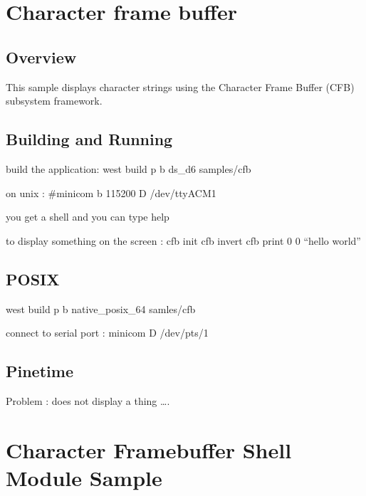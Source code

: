 \documentclass[letterpaper,10pt,english]{sphinxmanual}
\begin{document}
\section{Character frame buffer}
\label{\detokenize{samples/samplescfbREADME:character-frame-buffer}}\label{\detokenize{samples/samplescfbREADME:character-frame-buffer-sample}}\label{\detokenize{samples/samplescfbREADME::doc}}

\subsection{Overview}
\label{\detokenize{samples/samplescfbREADME:overview}}
This sample displays character strings using the Character Frame Buffer
(CFB) subsystem framework.


\subsection{Building and Running}
\label{\detokenize{samples/samplescfbREADME:building-and-running}}
build the application: west build \sphinxhyphen{}p \sphinxhyphen{}b ds\_d6 samples/cfb

on unix : \#minicom \sphinxhyphen{}b 115200 \sphinxhyphen{}D /dev/ttyACM1

you get a shell and you can type help

to display something on the screen :
cfb init
cfb invert
cfb print 0 0 “hello world”


\subsection{POSIX}
\label{\detokenize{samples/samplescfbREADME:posix}}
west build \sphinxhyphen{}p \sphinxhyphen{}b native\_posix\_64 samles/cfb

connect to serial port :
minicom \sphinxhyphen{}D /dev/pts/1


\subsection{Pinetime}
\label{\detokenize{samples/samplescfbREADME:pinetime}}
Problem : does not display a thing ….


\section{Character Framebuffer Shell Module Sample}
\label{\detokenize{samples/samplescfb_shellREADME:character-framebuffer-shell-module-sample}}\label{\detokenize{samples/samplescfb_shellREADME:cfb-shell-sample}}\label{\detokenize{samples/samplescfb_shellREADME::doc}}
\end{document}
